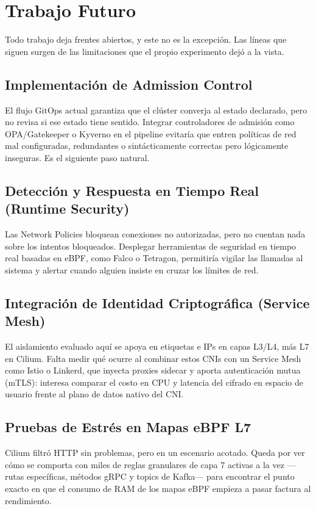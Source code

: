 \chapter{Trabajo Futuro} \label{sec:TrabajosFuturos}

Todo trabajo deja frentes abiertos, y este no es la excepción. Las líneas que siguen surgen de las limitaciones que el propio experimento dejó a la vista.

\section{Implementación de Admission Control}
El flujo GitOps actual garantiza que el clúster converja al estado declarado, pero no revisa si ese estado tiene sentido. Integrar controladores de admisión como OPA/Gatekeeper o Kyverno en el pipeline evitaría que entren políticas de red mal configuradas, redundantes o sintácticamente correctas pero lógicamente inseguras. Es el siguiente paso natural.

\section{Detección y Respuesta en Tiempo Real (Runtime Security)}
Las Network Policies bloquean conexiones no autorizadas, pero no cuentan nada sobre los intentos bloqueados. Desplegar herramientas de seguridad en tiempo real basadas en eBPF, como Falco o Tetragon, permitiría vigilar las llamadas al sistema y alertar cuando alguien insiste en cruzar los límites de red.

\section{Integración de Identidad Criptográfica (Service Mesh)}
El aislamiento evaluado aquí se apoya en etiquetas e IPs en capas L3/L4, más L7 en Cilium. Falta medir qué ocurre al combinar estos CNIs con un Service Mesh como Istio o Linkerd, que inyecta proxies sidecar y aporta autenticación mutua (mTLS): interesa comparar el costo en CPU y latencia del cifrado en espacio de usuario frente al plano de datos nativo del CNI.

\section{Pruebas de Estrés en Mapas eBPF L7}
Cilium filtró HTTP sin problemas, pero en un escenario acotado. Queda por ver cómo se comporta con miles de reglas granulares de capa 7 activas a la vez ---rutas específicas, métodos gRPC y topics de Kafka--- para encontrar el punto exacto en que el consumo de RAM de los mapas eBPF empieza a pasar factura al rendimiento.

